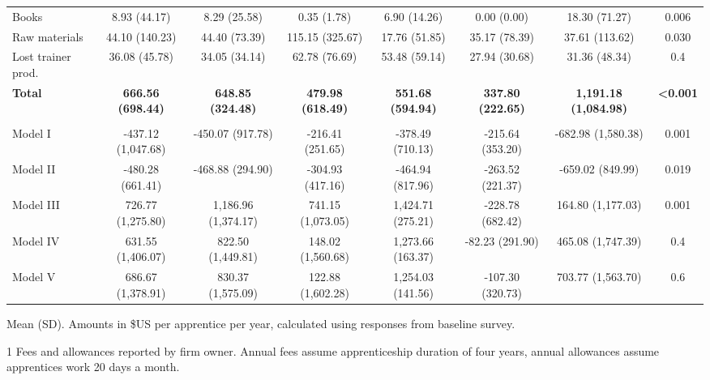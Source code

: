 \documentclass[
  11pt,
a4paper
]{report}
\begin{document}
\begin{landscape}
\begin{table}[H]
{\begin{threeparttable}
\begin{tabular}[t]{lccccccc}
\hspace{1em}\hspace{1em}Books & 8.93 (44.17) & 8.29 (25.58) & 0.35 (1.78) & 6.90 (14.26) & 0.00 (0.00) & 18.30 (71.27) & 0.006\\
\hspace{1em}\hspace{1em}Raw materials & 44.10 (140.23) & 44.40 (73.39) & 115.15 (325.67) & 17.76 (51.85) & 35.17 (78.39) & 37.61 (113.62) & 0.030\\
\hspace{1em}Lost trainer prod. & 36.08 (45.78) & 34.05 (34.14) & 62.78 (76.69) & 53.48 (59.14) & 27.94 (30.68) & 31.36 (48.34) & 0.4\\
\textbf{\hspace{1em}Total} & \textbf{666.56 (698.44)} & \textbf{648.85 (324.48)} & \textbf{479.98 (618.49)} & \textbf{551.68 (594.94)} & \textbf{337.80 (222.65)} & \textbf{1,191.18 (1,084.98)} & \textbf{<0.001}\\
\addlinespace[0.3em]
\multicolumn{8}{l}{\textbf{Net Benefits}}\\
\hspace{1em}Model I & -437.12 (1,047.68) & -450.07 (917.78) & -216.41 (251.65) & -378.49 (710.13) & -215.64 (353.20) & -682.98 (1,580.38) & 0.001\\
\hspace{1em}Model II & -480.28 (661.41) & -468.88 (294.90) & -304.93 (417.16) & -464.94 (817.96) & -263.52 (221.37) & -659.02 (849.99) & 0.019\\
\hspace{1em}Model III & 726.77 (1,275.80) & 1,186.96 (1,374.17) & 741.15 (1,073.05) & 1,424.71 (275.21) & -228.78 (682.42) & 164.80 (1,177.03) & 0.001\\
\hspace{1em}Model IV & 631.55 (1,406.07) & 822.50 (1,449.81) & 148.02 (1,560.68) & 1,273.66 (163.37) & -82.23 (291.90) & 465.08 (1,747.39) & 0.4\\
\hspace{1em}Model V & 686.67 (1,378.91) & 830.37 (1,575.09) & 122.88 (1,602.28) & 1,254.03 (141.56) & -107.30 (320.73) & 703.77 (1,563.70) & 0.6\\
\bottomrule
\end{tabular}
\begin{tablenotes}
\small
\item Mean (SD). Amounts in \$US per apprentice per year, calculated using responses from baseline survey.
\item[1] Fees and allowances reported by firm owner. Annual fees assume apprenticeship duration of four years, annual allowances assume apprentices work 20 days a month.
\end{tablenotes}
\end{threeparttable}}
\end{table}

\end{landscape}
\end{document}
